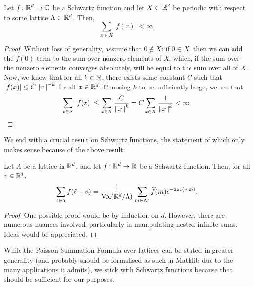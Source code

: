 \begin{lemma}\label{lemma:Schwartz-summable}\leanok
  Let $f : \mathbb{R}^d \to \mathbb{C}$ be a Schwartz function and let $X \subset \mathbb{R}^d$ be periodic with respect to some lattice $\Lambda \subset \mathbb{R}^d$. Then,
  \[
    \sum_{x \in X} |f(x)| < \infty.
  \]
\end{lemma}
\begin{proof}
  Without loss of generality, assume that $0 \notin X$: if $0 \in X$, then we can add the $f(0)$ term to the sum over nonzero elements of $X$, which, if the sum over the nonzero elements converges absolutely, will be equal to the sum over all of $X$. Now, we know that for all $k \in \mathbb{N}$, there exists some constant $C$ such that $|f(x)| \leq C\left\lVert x \right\rVert^{-k}$ for all $x \in \mathbb{R}^d$. Choosing $k$ to be sufficiently large, we see that
  \[
    \sum_{x \in X} |f(x)| \leq \sum_{x \in X} \frac{C}{\left\lVert x \right\rVert^{k}} = C \sum_{x \in X} \frac{1}{\left\lVert x \right\rVert^k} < \infty.
  \]
\end{proof}

We end with a crucial result on Schwartz functions, the statement of which only makes sense because of the above result.
\begin{theorem}\label{thm:Poisson-summation-formula}\leanok
  Let $\Lambda$ be a lattice in $\mathbb{R}^d$, and let $f:\mathbb{R}^d\to\mathbb{R}$ be a Schwartz function. Then, for all $v \in \mathbb{R}^d$,
  \[
    \sum_{\ell\in\Lambda}f(\ell + v) = \frac{1}{\operatorname{Vol}\!\left(\mathbb{R}^d/\Lambda\right)} \sum_{m\in\Lambda^*}\widehat{f}(m) e^{-2\pi i \left\langle v, m \right\rangle}.
  \]
\end{theorem}
\begin{proof}
  One possible proof would be by induction on $d$. However, there are numerous nuances involved, particularly in manipulating nested infinite sums. Ideas would be appreciated.
\end{proof}

While the Poisson Summation Formula over lattices can be stated in greater generality (and probably should be formalised as such in Mathlib due to the many applications it admits), we stick with Schwartz functions because that should be sufficient for our purposes.

